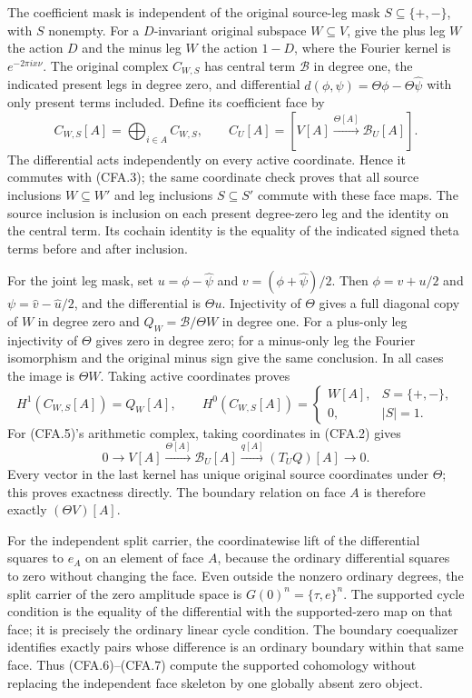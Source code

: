 The coefficient mask is independent of the original source-leg mask
$S\subseteq\{+,-\}$, with $S$ nonempty.  For a $D$-invariant original
subspace $W\subseteq V$, give the plus leg $W$ the action $D$ and
the minus leg $\widehat W$ the action $1-D$, where the Fourier kernel
is $e^{-2\pi ix\nu}$.  The original complex $C_{W,S}$ has central
term $\mathscr B$ in degree one, the indicated present legs in degree
zero, and differential
$d(\phi,\psi)=\Theta\phi-\Theta\widehat\psi$ with only present
terms included.  Define its coefficient face by
\[
 C_{W,S}[A]=\bigoplus_{i\in A}C_{W,S},\qquad
 C_U[A]=[V[A]\xrightarrow{\Theta[A]}\mathscr B_U[A]].           \tag{CFA.5}
\]
The differential acts independently on every active coordinate.
Hence it commutes with (CFA.3); the same coordinate check proves that
all source inclusions $W\subseteq W'$ and leg inclusions $S\subseteq S'$
commute with these face maps.  The source inclusion is inclusion on
each present degree-zero leg and the identity on the central term.
Its cochain identity is the equality of the indicated signed theta
terms before and after inclusion.

For the joint leg mask, set $u=\phi-\widehat\psi$ and
$v=(\phi+\widehat\psi)/2$.  Then
$\phi=v+u/2$ and $\psi=\widehat v-\widehat u/2$, and the differential
is $\Theta u$.  Injectivity of $\Theta$ gives a full diagonal copy of
$W$ in degree zero and $Q_W=\mathscr B/\Theta W$ in degree one.
For a plus-only leg injectivity of $\Theta$ gives zero in degree zero;
for a minus-only leg the Fourier isomorphism and the original minus
sign give the same conclusion.  In all cases the image is $\Theta W$.
Taking active coordinates proves
\[
 H^1(C_{W,S}[A])=Q_W[A],\qquad
 H^0(C_{W,S}[A])=
 \begin{cases}W[A],&S=\{+,-\},\\0,&|S|=1.
 \end{cases}                                                  \tag{CFA.6}
\]
For (CFA.5)'s arithmetic complex, taking coordinates in (CFA.2) gives
\[
 0\to V[A]\xrightarrow{\Theta[A]}\mathscr B_U[A]
       \xrightarrow{q[A]}(T_UQ)[A]\to0.                       \tag{CFA.7}
\]
Every vector in the last kernel has unique original source coordinates
under $\Theta$; this proves exactness directly.  The boundary relation
on face $A$ is therefore exactly $(\Theta V)[A]$.

For the independent split carrier, the coordinatewise lift of the
differential squares to $e_A$ on an element of face $A$, because the
ordinary differential squares to zero without changing the face.
Even outside the nonzero ordinary degrees, the split carrier of the
zero amplitude space is $G(0)^n=\{\tau,e\}^n$.  The supported cycle
condition is the equality of the differential with the supported-zero
map on that face; it is precisely the ordinary linear cycle condition.
The boundary coequalizer identifies exactly pairs whose difference is
an ordinary boundary within that same face.  Thus (CFA.6)--(CFA.7)
compute the supported cohomology without replacing the independent
face skeleton by one globally absent zero object.

